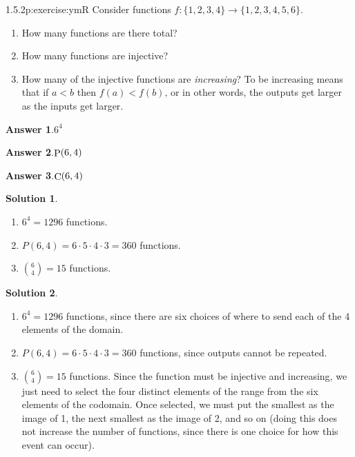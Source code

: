 \documentclass[twoside,11pt,]{book}
\newcommand{\blocktitlefont}{\relax}
\numberwithin{equation}{chapter}
\newcommand{\lt}{<}
\begin{document}
\begin{divisionsolution}{1.5.2}{}{p:exercise:ymR}%
Consider functions \(f: \{1,2,3,4\} \to \{1,2,3,4,5,6\}\text{.}\)%
\begin{enumerate}[label=(\alph*)]
\item{}How many functions are there total?%
\item{}How many functions are injective?%
\item{}How many of the injective functions are \emph{increasing}? To be increasing means that if \(a \lt b\) then \(f(a) \lt f(b)\text{,}\) or in other words, the outputs get larger as the inputs get larger.%
\end{enumerate}
%
\par\smallskip%
\noindent\textbf{\blocktitlefont Answer 1}.\quad{}\(6^{4}\)%
\par\smallskip%
\noindent\textbf{\blocktitlefont Answer 2}.\quad{}\(\mathop{\rm P}\nolimits\!\left(6,4\right)\)%
\par\smallskip%
\noindent\textbf{\blocktitlefont Answer 3}.\quad{}\(\mathop{\rm C}\nolimits\!\left(6,4\right)\)%
\par\smallskip%
\noindent\textbf{\blocktitlefont Solution 1}.\quad{}%
\begin{enumerate}[label=(\alph*)]
\item{}\(6^4 = 1296\) functions.%
\item{}\(P(6, 4) = 6 \cdot 5 \cdot 4 \cdot 3 = 360\) functions.%
\item{}\({6 \choose 4} = 15\) functions.%
\end{enumerate}
%
\par\smallskip%
\noindent\textbf{\blocktitlefont Solution 2}.\quad{}%
\begin{enumerate}[label=(\alph*)]
\item{}\(6^4 = 1296\) functions, since there are six choices of where to send each of the 4 elements of the domain.%
\item{}\(P(6, 4) = 6 \cdot 5 \cdot 4 \cdot 3 = 360\) functions, since outputs cannot be repeated.%
\item{}\({6 \choose 4} = 15\) functions. Since the function must be injective and increasing, we just need to select the four distinct elements of the range from the six elements of the codomain. Once selected, we must put the smallest as the image of 1, the next smallest as the image of 2, and so on (doing this does not increase the number of functions, since there is one choice for how this event can occur).%
\end{enumerate}
%
\end{divisionsolution}%
\end{document}
